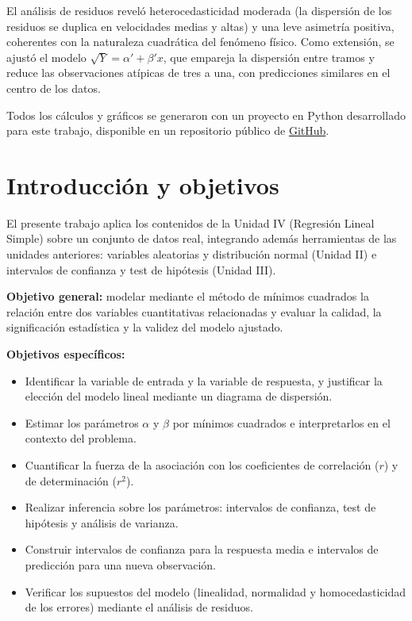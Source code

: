 \documentclass[12pt,a4paper]{article}
\begin{document}
El análisis de residuos reveló heterocedasticidad moderada (la dispersión de los residuos se duplica en velocidades medias y altas) y una leve asimetría positiva, coherentes con la naturaleza cuadrática del fenómeno físico. Como extensión, se ajustó el modelo $\sqrt{Y} = \alpha' + \beta' x$, que empareja la dispersión entre tramos y reduce las observaciones atípicas de tres a una, con predicciones similares en el centro de los datos.

Todos los cálculos y gráficos se generaron con un proyecto en Python desarrollado para este trabajo, disponible en un repositorio público de \href{https://github.com/pablo-origlia/tp_regresion_lineal}{GitHub}.
\newpage

\tableofcontents
\newpage

\section{Introducción y objetivos}

El presente trabajo aplica los contenidos de la Unidad IV (Regresión Lineal Simple) sobre un conjunto de datos real, integrando además herramientas de las unidades anteriores: variables aleatorias y distribución normal (Unidad II) e intervalos de confianza y test de hipótesis (Unidad III).

\textbf{Objetivo general:} modelar mediante el método de mínimos cuadrados la relación entre dos variables cuantitativas relacionadas y evaluar la calidad, la significación estadística y la validez del modelo ajustado.

\textbf{Objetivos específicos:}
\begin{itemize}[leftmargin=*]
  \item Identificar la variable de entrada y la variable de respuesta, y justificar la elección del modelo lineal mediante un diagrama de dispersión.
  \item Estimar los parámetros $\alpha$ y $\beta$ por mínimos cuadrados e interpretarlos en el contexto del problema.
  \item Cuantificar la fuerza de la asociación con los coeficientes de correlación ($r$) y de determinación ($r^2$).
  \item Realizar inferencia sobre los parámetros: intervalos de confianza, test de hipótesis y análisis de varianza.
  \item Construir intervalos de confianza para la respuesta media e intervalos de predicción para una nueva observación.
  \item Verificar los supuestos del modelo (linealidad, normalidad y homocedasticidad de los errores) mediante el análisis de residuos.
\end{itemize}
\end{document}
